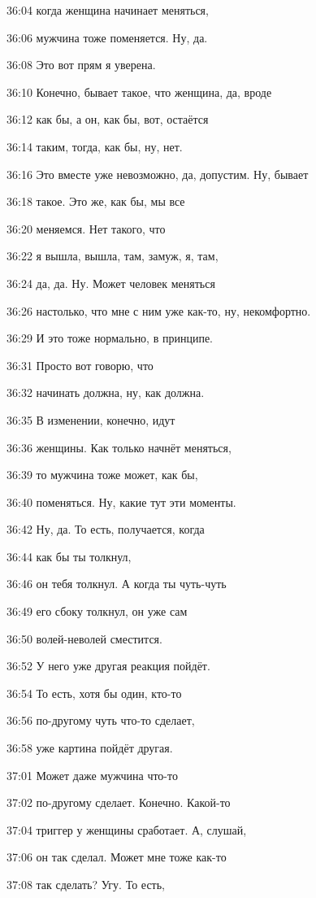 36:04
когда женщина начинает меняться,

36:06
мужчина тоже поменяется. Ну, да.

36:08
Это вот прям я уверена.

36:10
Конечно, бывает такое, что женщина, да, вроде

36:12
как бы, а он, как бы, вот, остаётся

36:14
таким, тогда, как бы, ну, нет.

36:16
Это вместе уже невозможно, да, допустим. Ну, бывает

36:18
такое. Это же, как бы, мы все

36:20
меняемся. Нет такого, что

36:22
я вышла, вышла, там, замуж, я, там,

36:24
да, да. Ну. Может человек меняться

36:26
настолько, что мне с ним уже как-то, ну, некомфортно.

36:29
И это тоже нормально, в принципе.

36:31
Просто вот говорю, что

36:32
начинать должна, ну, как должна.

36:35
В изменении, конечно, идут

36:36
женщины. Как только начнёт меняться,

36:39
то мужчина тоже может, как бы,

36:40
поменяться. Ну, какие тут эти моменты.

36:42
Ну, да. То есть, получается, когда

36:44
как бы ты толкнул,

36:46
он тебя толкнул. А когда ты чуть-чуть

36:49
его сбоку толкнул, он уже сам

36:50
волей-неволей сместится.

36:52
У него уже другая реакция пойдёт.

36:54
То есть, хотя бы один, кто-то

36:56
по-другому чуть что-то сделает,

36:58
уже картина пойдёт другая.

37:01
Может даже мужчина что-то

37:02
по-другому сделает. Конечно. Какой-то

37:04
триггер у женщины сработает. А, слушай,

37:06
он так сделал. Может мне тоже как-то

37:08
так сделать? Угу. То есть,

